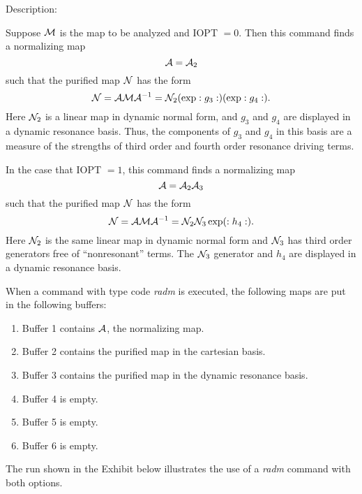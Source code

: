 \vspace{5mm}
     Description:
\vspace{2mm}

Suppose ${\cal M}$ is the map to be analyzed and IOPT $= 0$.  Then this command finds a normalizing map
\[
{\cal A} = {\cal A}_2
\]
such that the purified map ${\cal N}$ has the form
\[
{\cal N} = {\cal A} {\cal M} {\cal A}^{-1} = {\cal N}_2 (\exp :g_3:)(\exp :g_4:).
\]
Here ${\cal N}_2$ is a linear map in dynamic normal form, and $g_3$ and $g_4$ are displayed in a dynamic resonance basis.  Thus, the components of $g_3$ and $g_4$ in this basis are a measure of the strengths of third order and fourth order resonance driving terms.

In the case that IOPT $= 1$, this command finds a normalizing map
\[
{\cal A} = {\cal A}_2 {\cal A}_3
\]
such that the purified map ${\cal N}$ has the form
\[
{\cal N} = {\cal A} {\cal M} {\cal A}^{-1} = {\cal N}_2 {\cal N}_3 \exp (:h_4:).
\]
Here ${\cal N}_2$ is the same linear map in dynamic normal form and ${\cal N}_3$ has third order generators free of ``nonresonant'' terms.  The ${\cal N}_3$ generator and $h_4$ are displayed in a dynamic resonance basis.

     When a command with type code {\em radm } is executed, the following maps
are put in the following buffers:
\begin{enumerate}
           \item  Buffer 1 contains ${\cal A}$, the normalizing map.
           \item  Buffer 2 contains the purified map in the cartesian basis.
           \item  Buffer 3 contains the purified map in the dynamic resonance basis.
           \item  Buffer 4 is empty.
           \item  Buffer 5 is empty.
		   \item  Buffer 6 is empty.
\end{enumerate}

The \Mary run shown in the Exhibit below illustrates the use of a {\em radm} command with both options.

